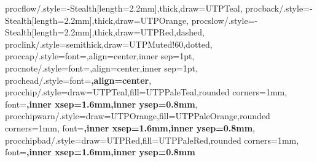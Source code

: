 {  procflow/.style={-{Stealth[length=2.2mm]},thick,draw=UTPTeal},
  procback/.style={-{Stealth[length=2.2mm]},thick,draw=UTPOrange},
  procslow/.style={-{Stealth[length=2.2mm]},thick,draw=UTPRed,dashed},
  proclink/.style={semithick,draw=UTPMuted!60,dotted},
  proccap/.style={font=\scriptsize\color{UTPMuted},align=center,inner sep=1pt},
  procnote/.style={font=\tiny\color{UTPMuted},align=center,inner sep=1pt},
  prochead/.style={font=\small\bfseries\color{UTPNavy},align=center},
  procchip/.style={draw=UTPTeal,fill=UTPPaleTeal,rounded corners=1mm,
                   font=\tiny\bfseries\color{UTPNavy},inner xsep=1.6mm,inner ysep=0.8mm},
  procchipwarn/.style={draw=UTPOrange,fill=UTPPaleOrange,rounded corners=1mm,
                       font=\tiny\bfseries\color{UTPNavy},inner xsep=1.6mm,inner ysep=0.8mm},
  procchipbad/.style={draw=UTPRed,fill=UTPPaleRed,rounded corners=1mm,
                      font=\tiny\bfseries\color{UTPNavy},inner xsep=1.6mm,inner ysep=0.8mm}
}
